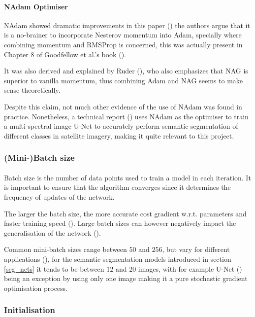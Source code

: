 \paragraph{\gls{NAdam} Optimiser}
\gls{NAdam} showed dramatic improvements in this paper (\cite{nadam}) the authors argue that it is a no-brainer to incorporate Nesterov momentum into \gls{Adam}, specially where combining momentum and \gls{RMSProp} is concerned, this was actually present in Chapter 8 of Goodfellow et al.'s book (\cite{GoodBengCour16}).

It was also derived and explained by Ruder (\cite{ruder2017overview}), who also emphasizes that \gls{NAG} is superior to vanilla momentum, thus combining \gls{Adam} and NAG seems to make sense theoretically. 

Despite this claim, not much other evidence of the use of \gls{NAdam} was found in practice. Nonetheless, a technical report (\cite{DBLP:journals/corr/IglovikovMO17}) uses \gls{NAdam} as the optimiser to train a multi-spectral image U-Net to accurately perform semantic segmentation of different classes in satellite imagery, making it quite relevant to this project.
\subsubsection{(Mini-)Batch size} \label{batch_size}
\paragraph{}
Batch size is the number of data points used to train a model in each iteration. It is important to ensure that the algorithm converges since it determines the frequency of updates of the network.

The larger the batch size, the more accurate cost gradient \gls{w.r.t.} parameters and faster training speed (\cite{deeplearning_ai}). Large batch sizes can however negatively impact the generalisation of the network (\cite{keskar2017largebatch}).

Common mini-batch sizes range between $50$ and $256$, but vary for different applications (\cite{ruder2017overview}), for the semantic segmentation models introduced in section \ref{seg_nets} it tends to be between $12$ and $20$ images, with for example U-Net (\cite{ronneberger2015unet}) being an exception by using only one image making it a pure stochastic gradient optimisation process.

\subsubsection{Initialisation} \label{initialisation}
